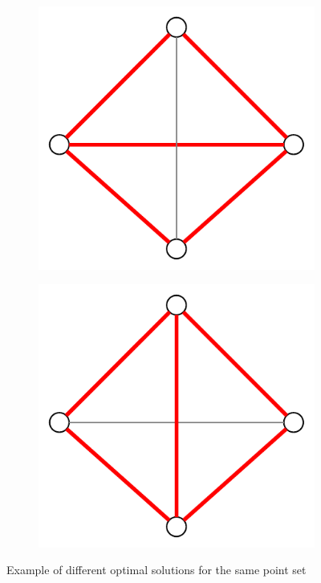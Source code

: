 \begin{figure}[ht]
  \centering
  \begin{subfigure}{0.25\textwidth}
    \centering
    \includegraphics[width=\textwidth]{img/non_unique_optimal_1.pdf}
  \end{subfigure}
  \hspace{2em}
  \VRule
  \hspace{2em}
  \centering
  \begin{subfigure}{0.25\textwidth}
    \centering
    \includegraphics[width=\textwidth]{img/non_unique_optimal_2.pdf}
  \end{subfigure}
  \caption{\label{fig:non_unique_optimal}Example of different optimal solutions for the same point set}
\end{figure}

